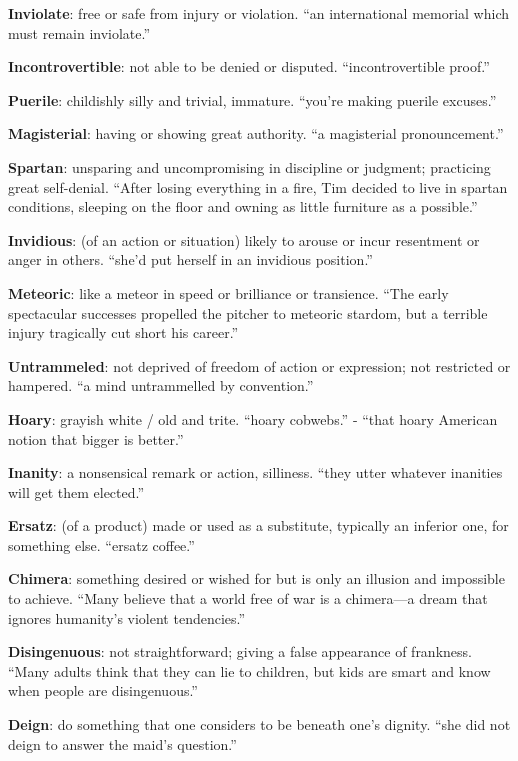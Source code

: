 \documentclass[12pt, a4paper]{ximera}
\begin{document}
\textbf{Inviolate}: free or safe from injury or violation. ``an international memorial which must remain inviolate.''

\textbf{Incontrovertible}: not able to be denied or disputed. ``incontrovertible proof.''

\textbf{Puerile}: childishly silly and trivial, immature. ``you're making puerile excuses.''

\textbf{Magisterial}: having or showing great authority. ``a magisterial pronouncement.''

\textbf{Spartan}: unsparing and uncompromising in discipline or judgment; practicing great self-denial. ``After losing everything in a fire, Tim decided to live in spartan conditions, sleeping on the floor and owning as little furniture as a possible.''

\textbf{Invidious}: (of an action or situation) likely to arouse or incur resentment or anger in others. ``she'd put herself in an invidious position.''

\textbf{Meteoric}: like a meteor in speed or brilliance or transience. ``The early spectacular successes propelled the pitcher to meteoric stardom, but a terrible injury tragically cut short his career.''

\textbf{Untrammeled}: not deprived of freedom of action or expression; not restricted or hampered. ``a mind untrammelled by convention.''

\textbf{Hoary}: grayish white / old and trite. ``hoary cobwebs.'' - ``that hoary American notion that bigger is better.''

\textbf{Inanity}: a nonsensical remark or action, silliness. ``they utter whatever inanities will get them elected.''

\textbf{Ersatz}: (of a product) made or used as a substitute, typically an inferior one, for something else. ``ersatz coffee.''

\textbf{Chimera}: something desired or wished for but is only an illusion and impossible to achieve. ``Many believe that a world free of war is a chimera—a dream that ignores humanity's violent tendencies.''

\textbf{Disingenuous}: not straightforward; giving a false appearance of frankness. ``Many adults think that they can lie to children, but kids are smart and know when people are disingenuous.''

\textbf{Deign}: do something that one considers to be beneath one's dignity. ``she did not deign to answer the maid's question.''
\end{document}
